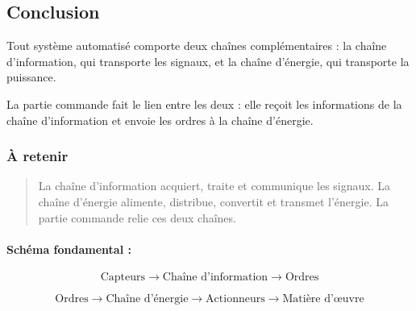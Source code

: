 \subsection{Conclusion}

Tout système automatisé comporte deux chaînes complémentaires : la chaîne d'information, qui transporte les signaux, et la chaîne d'énergie, qui transporte la puissance.

La partie commande fait le lien entre les deux : elle reçoit les informations de la chaîne d'information et envoie les ordres à la chaîne d'énergie.

\subsubsection*{À retenir}

\begin{quote}
La chaîne d'information acquiert, traite et communique les signaux. La chaîne d'énergie alimente, distribue, convertit et transmet l'énergie. La partie commande relie ces deux chaînes.
\end{quote}

\paragraph{Schéma fondamental :}

\[
\text{Capteurs} \rightarrow \text{Chaîne d'information} \rightarrow \text{Ordres}
\]

\[
\text{Ordres} \rightarrow \text{Chaîne d'énergie} \rightarrow \text{Actionneurs} \rightarrow \text{Matière d'œuvre}
\]